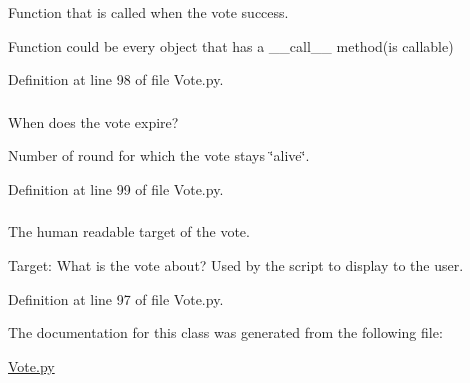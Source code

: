 Function that is called when the vote success. 

Function could be every object that has a \_\-\_\-call\_\-\_\- method(is callable) 

Definition at line 98 of file Vote.py.

\hypertarget{class_vote_1_1_vote_af6004cd9228253e93b618b769dbc8855}{
\subsubsection[{aliveRounds}]{}}
\label{class_vote_1_1_vote_af6004cd9228253e93b618b769dbc8855}


When does the vote expire? 

Number of round for which the vote stays \char`\"{}alive\char`\"{}. 

Definition at line 99 of file Vote.py.

\hypertarget{class_vote_1_1_vote_afe0be7a3c2d7d0439a478b1ef0b30ed6}{
\subsubsection[{target}]{}}
\label{class_vote_1_1_vote_afe0be7a3c2d7d0439a478b1ef0b30ed6}


The human readable target of the vote. 

Target: What is the vote about? Used by the script to display to the user. 

Definition at line 97 of file Vote.py.



The documentation for this class was generated from the following file:\begin{DoxyCompactItemize}
\item 
\hyperlink{_vote_8py}{Vote.py}\end{DoxyCompactItemize}
